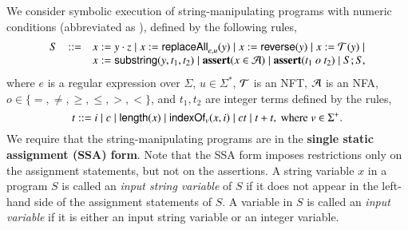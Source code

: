 
We consider symbolic execution of string-manipulating programs with numeric conditions (abbreviated as {\slint}), defined by the following rules, 
%
\[
\begin{array}{l c l}
S &::= &  x:= y \cdot z \mid x:= \mathsf{replaceAll}_{e,u}(y) \mid   x:=\mathsf{reverse}(y) \mid x:=\mathcal{T}(y) \mid \\
& & x := \mathsf{substring}(y, t_1, t_2)  \mid \textbf{assert}(x \in \mathcal{A}) \mid \textbf{assert}(t_1\ o\ t_2) \mid S;S, 
\end{array}
\]
where $e$ is a regular expression over $\Sigma$, $u \in \Sigma^*$, $\mathcal{T}$ is an NFT,  $\mathcal{A}$ is an NFA, $o \in \{=, \neq, \ge, \le, >, <\}$, and $t_1,t_2$ are integer terms defined by the rules,
\[
t  ::= i \mid c \mid \mathsf{length}(x) \mid \mathsf{indexOf}_v(x, i) \mid  ct  \mid t + t, \mbox{ where } v \in \Sigma^+.
\]
%
We require that the string-manipulating programs are in the {\bf single static assignment (SSA) form}. Note that the SSA form imposes restrictions only on the assignment statements, but not on the assertions. %
A string variable $x$ in a {\slint} program $S$ is called an \emph{input string variable} of $S$ if it does not appear in the left-hand side of the assignment statements of $S$. A variable in $S$ is called an \emph{input variable}  if it is either an input string variable or an integer variable.


